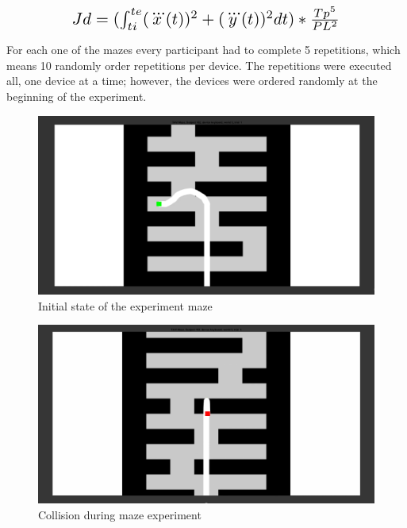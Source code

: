\begin{equation}
   \scalebox{1.5}{$Jd=(\int_{ti}^{te}(\dddot{x}(t))^2 + (\dddot{y}(t))^2 dt)*\frac{Tp^5}{PL^2}$}
   \centering
   \label{eq:dsjeq}
\end{equation}

For each one of the mazes every participant had to complete 5 repetitions, which means 10 randomly order repetitions per device. The repetitions were executed all, one device at a time; however, the devices were ordered randomly at the beginning of the experiment.\\

\begin{figure}[ht]
   \centering
   \includegraphics[width=1.0\textwidth]{img/maze/maze.png}
   \caption{Initial state of the experiment maze}
   \label{img:maze}
\end{figure}

\begin{figure}[ht]
   \centering
   \includegraphics[width=1.0\textwidth]{img/maze/mazeColl.png}
   \caption{Collision during maze experiment}
   \label{img:mazeColl}
\end{figure}

